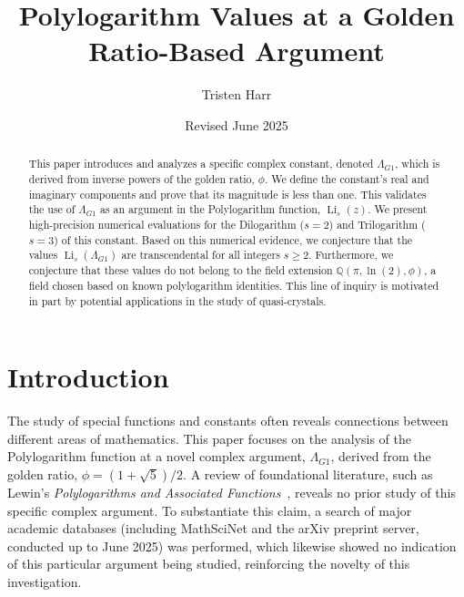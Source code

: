 \documentclass{amsart}
\theoremstyle{plain}
\theoremstyle{definition}
\theoremstyle{remark}
\DeclareMathOperator{\Li}{Li} %
\newcommand{\LambdaG}{\Lambda_{G1}}
\newcommand{\phiG}{\phi}
\begin{document}
\title[Polylogarithms at a Golden Ratio Argument]{Polylogarithm Values at a Golden Ratio-Based Argument}
\author{Tristen Harr}
\date{Revised June 2025}

\begin{abstract}
This paper introduces and analyzes a specific complex constant, denoted $\LambdaG$, which is derived from inverse powers of the golden ratio, $\phiG$. We define the constant's real and imaginary components and prove that its magnitude is less than one. This validates the use of $\LambdaG$ as an argument in the Polylogarithm function, $\Li_s(z)$. We present high-precision numerical evaluations for the Dilogarithm ($s=2$) and Trilogarithm ($s=3$) of this constant. Based on this numerical evidence, we conjecture that the values $\Li_s(\LambdaG)$ are transcendental for all integers $s \ge 2$. Furthermore, we conjecture that these values do not belong to the field extension $\mathbb{Q}(\pi, \ln(2), \phiG)$, a field chosen based on known polylogarithm identities. This line of inquiry is motivated in part by potential applications in the study of quasi-crystals.
\end{abstract}

\maketitle

\section{Introduction}
The study of special functions and constants often reveals connections between different areas of mathematics. This paper focuses on the analysis of the Polylogarithm function at a novel complex argument, $\LambdaG$, derived from the golden ratio, $\phiG = (1+\sqrt{5})/2$. A review of foundational literature, such as Lewin's \textit{Polylogarithms and Associated Functions}~\cite{Lewin}, reveals no prior study of this specific complex argument. To substantiate this claim, a search of major academic databases (including MathSciNet and the arXiv preprint server, conducted up to June 2025) was performed, which likewise showed no indication of this particular argument being studied, reinforcing the novelty of this investigation.
\end{document}
